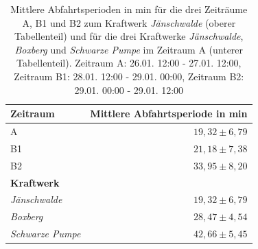 \begin{table}[!ht]
	\centering
	\caption{Mittlere Abfahrtsperioden in min für die drei Zeiträume A, B1 und B2 zum Kraftwerk \emph{Jänschwalde} (oberer Tabellenteil) und für die drei Kraftwerke \emph{Jänschwalde}, \emph{Boxberg} und \emph{Schwarze Pumpe} im Zeitraum A (unterer Tabellenteil). Zeitraum A: 26.01. 12:00 - 27.01. 12:00, Zeitraum B1: 28.01. 12:00 - 29.01. 00:00, Zeitraum B2: 29.01. 00:00 - 29.01. 12:00}
	\label{tab:results}
	\begin{tabular}{|l|r|}
		\hline
		\textbf{Zeitraum} & \textbf{Mittlere Abfahrtsperiode in min} \\
		\hline
		\hline
		A & $19,32 \pm 6,79$\\
		\hline
		B1 & $21,18 \pm 7,38$\\
		\hline
        B2 & $33,95 \pm 8,20$\\
		\hline
		\hline
        \textbf{Kraftwerk} & \\
		\hline
		\hline
        \emph{Jänschwalde} & $19,32 \pm 6,79$\\
		\hline
        \emph{Boxberg} & $28,47 \pm 4,54$\\
		\hline
		\emph{Schwarze Pumpe} & $42,66 \pm 5,45$\\
		\hline
	\end{tabular}
\end{table}